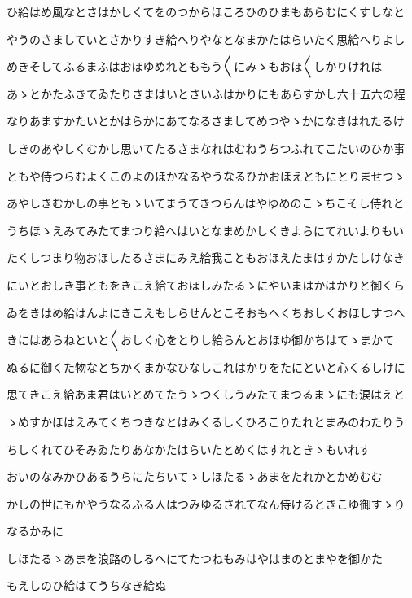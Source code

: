 \documentclass[a4paper,11pt,landscape]{ltjtarticle}
\begin{document}
ひ給はめ風なとさはかしくてをのつからほころひのひまもあらむにくすしなと
\par\medskip
やうのさましていとさかりすき給へりやなとなまかたはらいたく思給へりよし
\par\medskip
めきそしてふるまふはおほゆめれとももう〱にみゝもおほ〱しかりけれは
\par\medskip
あゝとかたふきてゐたりさまはいとさいふはかりにもあらすかし六十五六の程
\par\medskip
なりあますかたいとかはらかにあてなるさましてめつやゝかになきはれたるけ
\par\medskip
しきのあやしくむかし思いてたるさまなれはむねうちつふれてこたいのひか事
\par\medskip
ともや侍つらむよくこのよのほかなるやうなるひかおほえともにとりませつゝ
\par\medskip
あやしきむかしの事ともゝいてまうてきつらんはやゆめのこゝちこそし侍れと
\par\medskip
うちほゝえみてみたてまつり給へはいとなまめかしくきよらにてれいよりもい
\par\medskip
たくしつまり物おほしたるさまにみえ給我こともおほえたまはすかたしけなき
\par\medskip
にいとおしき事ともをきこえ給ておほしみたるゝにやいまはかはかりと御くら
\par\medskip
ゐをきはめ給はんよにきこえもしらせんとこそおもへくちおしくおほしすつへ
\par\medskip
きにはあらねといと〱おしく心をとりし給らんとおほゆ御かちはてゝまかて
\par\medskip
ぬるに御くた物なとちかくまかなひなしこれはかりをたにといと心くるしけに
\par\medskip
思てきこえ給あま君はいとめてたうゝつくしうみたてまつるまゝにも涙はえと
\par\medskip
ゝめすかほはえみてくちつきなとはみくるしくひろこりたれとまみのわたりう
\par\medskip
ちしくれてひそみゐたりあなかたはらいたとめくはすれときゝもいれす
\par\medskip
おいのなみかひあるうらにたちいてゝしほたるゝあまをたれかとかめむむ
\par\medskip
かしの世にもかやうなるふる人はつみゆるされてなん侍けるときこゆ御すゝり
\par\medskip
なるかみに
\par\medskip
しほたるゝあまを浪路のしるへにてたつねもみはやはまのとまやを御かた
\par\medskip
もえしのひ給はてうちなき給ぬ
\par\medskip
\end{document}
